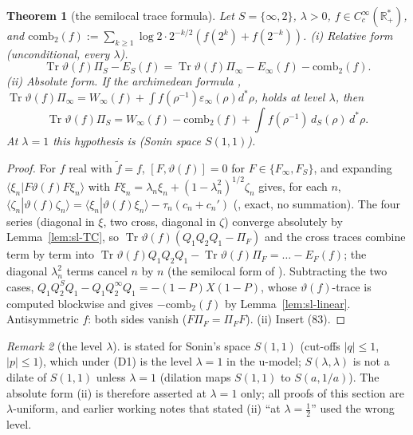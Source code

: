 \documentclass[11pt]{amsart}
\newtheorem{theorem}{Theorem}[section]
\theoremstyle{definition}
\theoremstyle{remark}
\newtheorem{remark}[theorem]{Remark}
\newcommand{\R}{\mathbb R}
\begin{document}
\begin{theorem}[the semilocal trace formula]\label{thm:sl-84}
Let $S=\{\infty,2\}$, $\lambda>0$, $f\in C_c^\infty(\R_+^*)$, and
$\mathrm{comb}_2(f):=\sum_{k\ge1}\log2\cdot2^{-k/2}(f(2^k)+f(2^{-k}))$.
\emph{(i) Relative form (unconditional, every $\lambda$).}
\[
\operatorname{Tr}\vartheta(f)\Pi_S-E_S(f)=\operatorname{Tr}\vartheta(f)\Pi_\infty-E_\infty(f)-\mathrm{comb}_2(f).
\]
\emph{(ii) Absolute form.} If the archimedean formula \cite[Thm.~4.7, (83)]{ConnesConsani2021},
$\operatorname{Tr}\vartheta(f)\Pi_\infty=W_\infty(f)+\int f(\rho^{-1})\varepsilon_\infty(\rho)d^*\rho$, holds at level $\lambda$, then
\[
\operatorname{Tr}\vartheta(f)\Pi_S=W_\infty(f)-\mathrm{comb}_2(f)+\int f(\rho^{-1})\,d_S(\rho)\,d^*\rho .
\]
At $\lambda=1$ this hypothesis is \cite[Thm.~4.7]{ConnesConsani2021} (Sonin space $S(1,1)$).
\end{theorem}
\begin{proof}
For $f$ real with $\tilde f=f$, $[F,\vartheta(f)]=0$ for $F\in\{F_\infty,F_S\}$, and expanding
$\langle\xi_n|F\vartheta(f)F\xi_n\rangle$ with $F\xi_n=\lambda_n\xi_n+(1-\lambda_n^2)^{1/2}\zeta_n$ gives, for each $n$,
$\langle\zeta_n|\vartheta(f)\zeta_n\rangle=\langle\xi_n|\vartheta(f)\xi_n\rangle-\tau_n(c_n+c_n')$ (\cite[(87)]{ConnesConsani2021},
exact, no summation). The four series (diagonal in $\xi$, two cross, diagonal in $\zeta$) converge absolutely by
Lemma~\ref{lem:sl-TC}, so $\operatorname{Tr}\vartheta(f)(Q_1Q_2Q_1-\Pi_F)$ and the cross traces combine term by term into
$\operatorname{Tr}\vartheta(f)Q_1Q_2Q_1-\operatorname{Tr}\vartheta(f)\Pi_F=\ldots-E_F(f)$; the diagonal $\lambda_n^2$ terms cancel
$n$ by $n$ (the semilocal form of \cite[(89)--(90)]{ConnesConsani2021}). Subtracting the two cases,
$Q_1Q_2^SQ_1-Q_1Q_2^\infty Q_1=-(1-P)X(1-P)$, whose $\vartheta(f)$-trace is computed blockwise and gives
$-\mathrm{comb}_2(f)$ by Lemma~\ref{lem:sl-linear}. Antisymmetric $f$: both sides vanish ($F\Pi_F=\Pi_FF$). (ii) Insert
(83).
\end{proof}

\begin{remark}[the level $\lambda$]\label{rem:sl-level}
\cite[Thm.~4.7]{ConnesConsani2021} is stated for Sonin's space $S(1,1)$ (cut-offs $|q|\le1$, $|p|\le1$), which under
(D1) is the level $\lambda=1$ in the u-model; $S(\lambda,\lambda)$ is not a dilate of $S(1,1)$ unless $\lambda=1$
(dilation maps $S(1,1)$ to $S(a,1/a)$). The absolute form (ii) is therefore asserted at $\lambda=1$ only; all
proofs of this section are $\lambda$-uniform, and earlier working notes that stated (ii) ``at $\lambda=\frac12$''
used the wrong level.
\end{remark}
\end{document}

